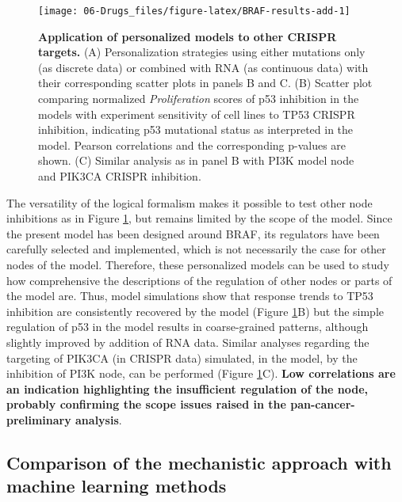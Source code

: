 \documentclass[a4paper,12pt,twoside,onecolumn,openright,final,oldfontcommands]{memoir}
\begin{document}
\begin{figure}

{\centering \texttt{[image: 06-Drugs\_files/figure-latex/BRAF-results-add-1]} 

}

\caption[Application of personalized models to other CRISPR targets]{\textbf{Application of personalized
models to other CRISPR targets.} (A) Personalization strategies using
either mutations only (as discrete data) or combined with RNA (as
continuous data) with their corresponding scatter plots in panels B and
C. (B) Scatter plot comparing normalized \emph{Proliferation} scores of
p53 inhibition in the models with experiment sensitivity of cell lines
to TP53 CRISPR inhibition, indicating p53 mutational status as
interpreted in the model. Pearson correlations and the corresponding
p-values are shown. (C) Similar analysis as in panel B with PI3K model
node and PIK3CA CRISPR inhibition.}\label{fig:BRAF-results-add}
\end{figure}












The versatility of the logical formalism makes it possible to test other
node inhibitions as in Figure \ref{fig:BRAF-results-add}, but remains
limited by the scope of the model. Since the present model has been
designed around BRAF, its regulators have been carefully selected and
implemented, which is not necessarily the case for other nodes of the
model. Therefore, these personalized models can be used to study how
comprehensive the descriptions of the regulation of other nodes or parts
of the model are. Thus, model simulations show that response trends to
TP53 inhibition are consistently recovered by the model (Figure
\ref{fig:BRAF-results-add}B) but the simple regulation of p53 in the
model results in coarse-grained patterns, although slightly improved by
addition of RNA data. Similar analyses regarding the targeting of PIK3CA
(in CRISPR data) simulated, in the model, by the inhibition of PI3K
node, can be performed (Figure \ref{fig:BRAF-results-add}C). \textbf{Low
correlations are an indication highlighting the insufficient regulation
of the node, probably confirming the scope issues raised in the
pan-cancer-preliminary analysis}.

\subsection{Comparison of the mechanistic approach with machine learning
methods}\label{ML-comp}
\end{document}
